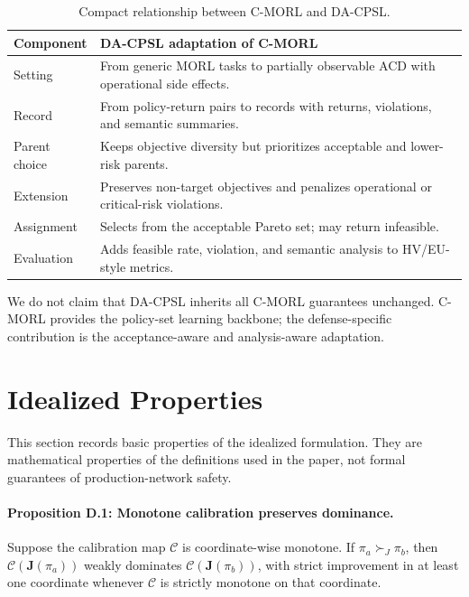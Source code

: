 \documentclass[sigconf,review,anonymous]{acmart}
\begin{document}
\begin{table}[!htbp]
\centering
\caption{Compact relationship between C-MORL and DA-CPSL.}
\label{tab:app-cmorl-relation}
\begingroup
\footnotesize
\setlength{\tabcolsep}{3pt}
\renewcommand{\arraystretch}{1.12}
\begin{tabular*}{\columnwidth}{@{\extracolsep{\fill}}p{}p{}@{}}
\toprule
Component & DA-CPSL adaptation of C-MORL \\
\midrule
Setting & From generic MORL tasks to partially observable ACD with operational side effects. \\
Record & From policy-return pairs to records with returns, violations, and semantic summaries. \\
Parent choice & Keeps objective diversity but prioritizes acceptable and lower-risk parents. \\
Extension & Preserves non-target objectives and penalizes operational or critical-risk violations. \\
Assignment & Selects from the acceptable Pareto set; may return infeasible. \\
Evaluation & Adds feasible rate, violation, and semantic analysis to HV/EU-style metrics. \\
\bottomrule
\end{tabular*}
\endgroup
\end{table}

We do not claim that DA-CPSL inherits all C-MORL guarantees unchanged.
C-MORL provides the policy-set learning backbone; the defense-specific
contribution is the acceptance-aware and analysis-aware adaptation.

\section{Idealized Properties}
\label{app:idealized-properties}

This section records basic properties of the idealized formulation. They
are mathematical properties of the definitions used in the paper, not
formal guarantees of production-network safety.

\paragraph{Proposition D.1: Monotone calibration preserves dominance.}
Suppose the calibration map \(\mathcal{C}\) is coordinate-wise monotone.
If \(\pi_a\succ_J \pi_b\), then
\(\mathcal{C}(\mathbf{J}(\pi_a))\) weakly dominates
\(\mathcal{C}(\mathbf{J}(\pi_b))\), with strict improvement in at least
one coordinate whenever \(\mathcal{C}\) is strictly monotone on that
coordinate.
\end{document}
